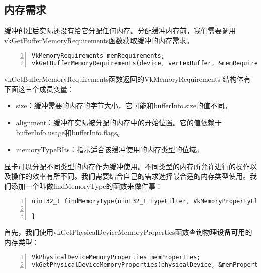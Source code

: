 \documentclass{ctexart}
\begin{document}
\subsection{内存需求}

缓冲创建后实际还没有给它分配任何内存。分配缓冲内存前，我们需要调用vkGetBufferMemoryRequirements函数获取缓冲的内存需求。

\begin{lstlisting}[language={[ANSI]C},keywordstyle=\color{blue!70},commentstyle=\color{red!50!green!50!blue!50},frame=shadowbox, rulesepcolor=\color{red!20!green!20!blue!20},basicstyle=\small,numbers=left, numberstyle=\tiny,breaklines=true]
VkMemoryRequirements memRequirements;
vkGetBufferMemoryRequirements(device, vertexBuffer, &memRequirements);
\end{lstlisting}

vkGetBufferMemoryRequirements函数返回的VkMemoryRequirements 结构体有下面这三个成员变量：

\begin{itemize}
	\item size：缓冲需要的内存的字节大小，它可能和bufferInfo.size的值不同。
	\item alignment：缓冲在实际被分配的内存中的开始位置。它的值依赖于bufferInfo.usage和bufferInfo.flags。
	\item memoryTypeBIts：指示适合该缓冲使用的内存类型的位域。
\end{itemize}

显卡可以分配不同类型的内存作为缓冲使用。不同类型的内存所允许进行的操作以及操作的效率有所不同。我们需要结合自己的需求选择最合适的内存类型使用。我们添加一个叫做findMemoryType的函数来做件事：

\begin{lstlisting}[language={[ANSI]C},keywordstyle=\color{blue!70},commentstyle=\color{red!50!green!50!blue!50},frame=shadowbox, rulesepcolor=\color{red!20!green!20!blue!20},basicstyle=\small,numbers=left, numberstyle=\tiny,breaklines=true]
uint32_t findMemoryType(uint32_t typeFilter, VkMemoryPropertyFlags properties) {

}
\end{lstlisting}

首先，我们使用vkGetPhysicalDeviceMemoryProperties函数查询物理设备可用的内存类型：

\begin{lstlisting}[language={[ANSI]C},keywordstyle=\color{blue!70},commentstyle=\color{red!50!green!50!blue!50},frame=shadowbox, rulesepcolor=\color{red!20!green!20!blue!20},basicstyle=\small,numbers=left, numberstyle=\tiny,breaklines=true]
VkPhysicalDeviceMemoryProperties memProperties;
vkGetPhysicalDeviceMemoryProperties(physicalDevice, &memProperties);
\end{lstlisting}
\end{document}
